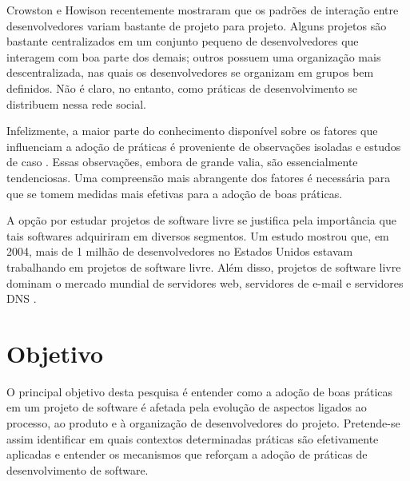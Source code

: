 \documentclass{article}
\begin{document}
Crowston e Howison \cite{crowston2005} recentemente mostraram que os padrões de
interação entre desenvolvedores variam bastante de projeto para projeto. Alguns
projetos são bastante centralizados em um conjunto pequeno de desenvolvedores
que interagem com boa parte dos demais; outros possuem uma organização mais
descentralizada, nas quais os desenvolvedores se organizam em grupos bem
definidos. Não é claro, no entanto, como práticas de desenvolvimento se
distribuem nessa rede social. 

Infelizmente, a maior parte do conhecimento disponível sobre os fatores que
influenciam a adoção de práticas é proveniente de observações isoladas e estudos
de caso \cite{crowston2005}. Essas observações, embora de grande valia, são
essencialmente tendenciosas. Uma compreensão mais abrangente dos fatores é
necessária para que se tomem medidas mais efetivas para a adoção de boas
práticas.

A opção por estudar projetos de software livre se justifica pela importância que
tais softwares adquiriram em diversos segmentos. Um estudo mostrou que, em 2004,
mais de 1 milhão de desenvolvedores no Estados Unidos estavam trabalhando em
projetos de software livre. Além disso, projetos de software livre dominam o
mercado mundial de servidores web, servidores de e-mail e servidores DNS
\cite{wheeler2007}.



\section{Objetivo}

O principal objetivo desta pesquisa é entender como a adoção de boas práticas
em um projeto de software é afetada pela evolução de aspectos ligados ao
processo, ao produto e à organização de desenvolvedores do projeto.
Pretende-se assim identificar em quais contextos determinadas práticas são
efetivamente aplicadas e entender os mecanismos que reforçam a adoção de
práticas de desenvolvimento de software.
\end{document}
